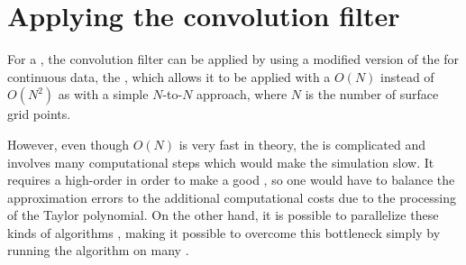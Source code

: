 \section{Applying the convolution filter}

For a , the convolution filter can be applied by using a modified version of the \FMM{} \citep{Greengard1985,Greengard1987a} for continuous data, the \CFMM{} \citep{White1994}, which allows it to be applied with a $O(N)$  instead of $O(N^2)$ as with a simple $N$-to-$N$ approach, where $N$ is the number of surface grid points.

However, even though $O(N)$ is very fast in theory, the \CFMM is complicated and involves many computational steps which would make the simulation slow. It requires a high-order  in order to make a good \approximation, so one would have to balance the approximation errors to the additional computational costs due to the processing of the Taylor polynomial. On the other hand, it is possible to parallelize these kinds of algorithms \citep[see e.g.][]{Board1994}, making it possible to overcome this bottleneck simply by running the algorithm on many .

